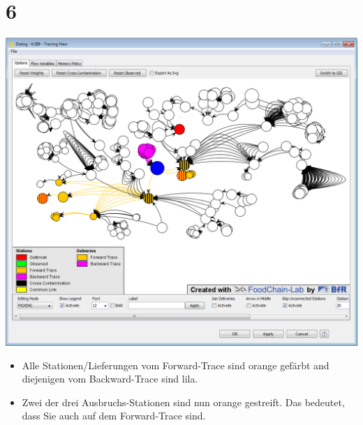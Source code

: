 \documentclass{beamer}
\begin{document}
\section{6}
\begin{frame}
	\begin{center}
  		\includegraphics[height=0.6\textheight]{6.png}
	\end{center}
	\begin{itemize}
		\item Alle Stationen/Lieferungen vom Forward-Trace sind orange gefärbt and diejenigen vom Backward-Trace sind lila.
		\item Zwei der drei Ausbruchs-Stationen sind nun orange gestreift. Das bedeutet, dass Sie auch auf dem Forward-Trace sind.
	\end{itemize}
\end{frame}
\end{document}
